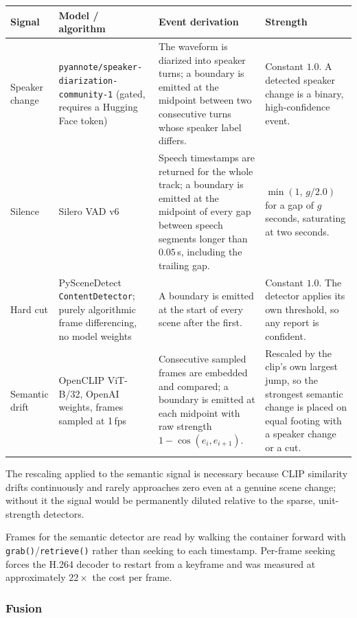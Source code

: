 \begin{table}[htbp]
\centering
\small
\begin{tabularx}{\textwidth}{@{}L{1.9cm}L{3.5cm}XL{2.5cm}@{}}
\toprule
\textbf{Signal} & \textbf{Model / algorithm} & \textbf{Event derivation} & \textbf{Strength} \\
\midrule
Speaker change & \texttt{pyannote/speaker-\allowbreak diarization-\allowbreak community-1} (gated, requires a Hugging Face token) &
The waveform is diarized into speaker turns; a boundary is emitted at the midpoint
between two consecutive turns whose speaker label differs. &
Constant $1.0$. A detected speaker change is a binary, high-confidence event. \\
Silence & Silero VAD v6 &
Speech timestamps are returned for the whole track; a boundary is emitted at the
midpoint of every gap between speech segments longer than $0.05$\,s, including the
trailing gap. &
$\min(1,\, g/2.0)$ for a gap of $g$ seconds, saturating at two seconds. \\
Hard cut & PySceneDetect \texttt{ContentDetector}; purely algorithmic frame differencing, no model weights &
A boundary is emitted at the start of every scene after the first. &
Constant $1.0$. The detector applies its own threshold, so any report is confident. \\
Semantic drift & OpenCLIP ViT-B/32, OpenAI weights, frames sampled at 1\,fps &
Consecutive sampled frames are embedded and compared; a boundary is emitted at each
midpoint with raw strength $1-\cos(e_i, e_{i+1})$. &
Rescaled by the clip's own largest jump, so the strongest semantic change is placed on
equal footing with a speaker change or a cut. \\
\bottomrule
\end{tabularx}
\end{table}

The rescaling applied to the semantic signal is necessary because CLIP similarity drifts
continuously and rarely approaches zero even at a genuine scene change; without it the
signal would be permanently diluted relative to the sparse, unit-strength detectors.

Frames for the semantic detector are read by walking the container forward with
\texttt{grab()}/\texttt{retrieve()} rather than seeking to each timestamp. Per-frame
seeking forces the H.264 decoder to restart from a keyframe and was measured at
approximately $22\times$ the cost per frame.

\subsubsection*{Fusion}

